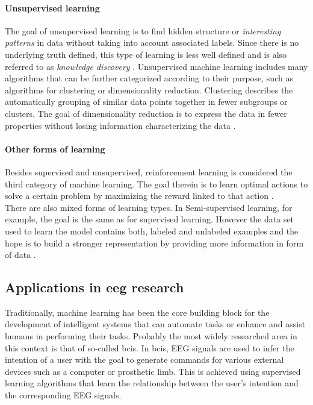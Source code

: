 \paragraph{Unsupervised learning}
The goal of unsupervised learning is to find hidden structure or \textit{interesting patterns} in data without taking into account associated labels. Since there is no underlying truth defined, this type of learning is less well defined and is also referred to as \textit{knowledge discovery} \cite{Murphy2012}. Unsupervised machine learning includes many algorithms that can be further categorized according to their purpose, such as algorithms for clustering or dimensionality reduction. Clustering describes the automatically grouping of similar data points together in fewer subgroups or clusters. The goal of dimensionality reduction is to express the data in fewer properties without losing information characterizing the data \cite{Cunningham2014}. 

\paragraph{Other forms of learning}
Besides supervised and unsupervised, reinforcement learning is considered the third category of machine learning. The goal therein is to learn optimal actions to solve a certain problem by maximizing the reward linked to that action \cite{Murphy2012}.\\
There are also mixed forms of learning types. In Semi-supervised learning, for example, the goal is the same as for supervised learning. However the data set used to learn the model contains both, labeled and unlabeled examples and the hope is to build a stronger representation by providing more information in form of data \cite{Burkov2019}.

\subsection{Applications in \gls{eeg} research}
Traditionally, machine learning has been the core building block for the development of intelligent systems that can automate tasks or enhance and assist humans in performing their tasks. Probably the most widely researched area in this context is that of so-called \glspl{bci}. In \glspl{bci}, EEG signals are used to infer the intention of a user with the goal to generate commands for various external devices such as a computer or prosthetic limb\cite{Saha2021, Anumanchipalli2019}. This is achieved using supervised learning algorithms that learn the relationship between the user's intention and the corresponding EEG signals.




























